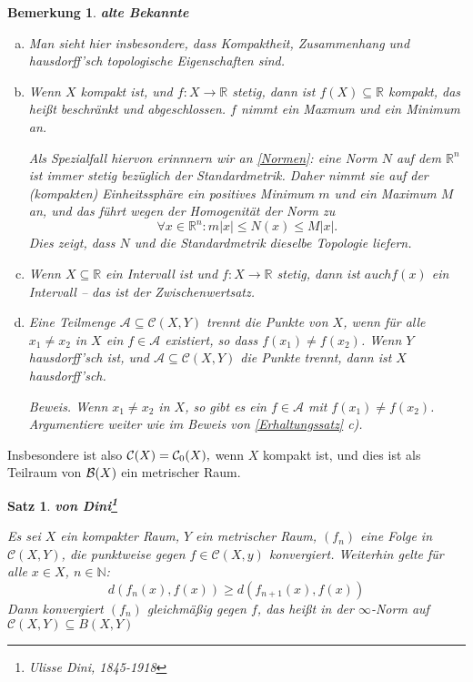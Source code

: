 \documentclass[12pt]{scrbook}   %
\newtheorem{bemX}[alles]{Bemerkung}
\newenvironment{bem}[1]{\begin{bemX}{\bf #1}\par\rm}{\end{bemX}}
\newtheorem{satzX}[alles]{Satz}
\newenvironment{satz}[1]{\begin{satzX}{\bf #1}\nopagebreak\par}{\end{satzX}}
\begin{document}
\begin{bem}{alte Bekannte}

\begin{enumerate}[a)]
\item Man sieht hier insbesondere, dass Kompaktheit, Zusammenhang und hausdorff’sch topologische Eigenschaften sind.

\item Wenn $X$ kompakt ist, und $f:X\to \mathbb R$ stetig, dann  ist $f(X) \subseteq \mathbb R$ kompakt, das heißt beschränkt und abgeschlossen. $f$ nimmt ein Maxmum und ein Minimum an.

Als Spezialfall hiervon erinnnern wir an \ref{Normen}: eine Norm $N$ auf dem 
$\mathbb R^n$ ist immer stetig bezüglich der Standardmetrik. Daher nimmt sie 
auf der (kompakten) Einheitssphäre ein positives Minimum $m$ und ein Maximum
$M$ an, und das führt wegen der Homogenität der Norm zu
$$\forall x\in \mathbb R^n : m|x| \leq N(x) \leq M|x|.$$
Dies zeigt, dass $N$ und die Standardmetrik dieselbe Topologie liefern.
\item
Wenn $X\subseteq \mathbb R$ ein Intervall ist und $f:X\to \mathbb R$ stetig, dann ist $auch f(x)$  ein 
Intervall -- das ist der Zwischenwertsatz.

\item Eine Teilmenge $\mathcal A \subseteq \mathcal C(X,Y)$ {\it trennt die Punkte} von $X$, wenn für alle $x_1\ne x_2$ in $X$ ein $f\in \mathcal A$ existiert, so dass $f(x_1) \ne f(x_2)$. Wenn $Y$ hausdorff’sch ist, und $\mathcal A \subseteq \mathcal C(X,Y)$ die Punkte trennt, dann ist $X$ hausdorff’sch.

{\it Beweis.}
Wenn $x_1\ne x_2$ in $X$, so gibt es ein $f\in \mathcal A$ mit $f(x_1) \ne f(x_2)$. Argumentiere weiter wie im Beweis von \ref{Erhaltungssatz} c).
\end{enumerate}
\end{bem}

Insbesondere ist also ${\cal C}(X) = {\cal C}_0(X),$ wenn $X$ kompakt ist, und 
dies ist als Teilraum von ${\cal B}(X)$ ein metrischer Raum.


\begin{satz}{von Dini\footnote{Ulisse Dini, 1845-1918}}
\label{satzvondini}
Es sei $X$ ein kompakter Raum, $Y$ ein metrischer Raum, $(f_n)$ eine Folge in $\mathcal C(X,Y)$, die punktweise gegen $f\in \mathcal C(X,y)$ konvergiert. Weiterhin gelte für alle $x\in X$, $n\in \mathbb N$:
\[
d(f_n(x), f(x)) \ge d(f_{n+1}(x), f(x))
\]
Dann konvergiert $(f_n)$ gleichmäßig gegen $f$, das heißt in der $\infty$-Norm auf $\mathcal C(X,Y) \subseteq B(X,Y)$
\end{satz}
\end{document}
